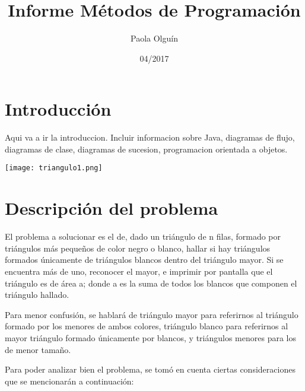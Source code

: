 \documentclass[spanish]{article}
\title{Informe M\'etodos de Programaci\'on}
\date{04/2017}
\author{Paola Olgu\'in}
\begin{document}

  \maketitle{}

  \newpage


  \tableofcontents{}

  \section{Introducci\'on}
  Aqui va a ir la introduccion. Incluir informacion sobre Java, diagramas de flujo,
  diagramas de clase, diagramas de sucesion, programacion orientada a objetos.
  \\
  \begin{center}
  \texttt{[image: triangulo1.png]}
  \end{center}

  \newpage
  \section{Descripci\'on del problema}

  \par
  El problema a solucionar es el de, dado un triángulo de n filas,
  formado por triángulos más pequeños de color negro o blanco, hallar si hay
  triángulos formados únicamente de triángulos blancos dentro del triángulo
  mayor. Si se encuentra más de uno, reconocer el mayor, e imprimir por pantalla
  que el triángulo es de área a; donde a es la suma de todos los blancos que
  componen el triángulo hallado.\par
  Para menor confusión, se hablará de triángulo mayor para
  referirnos al triángulo formado por los menores de ambos colores, triángulo
  blanco para referirnos al mayor triángulo formado únicamente por blancos, y
  triángulos menores para los de menor tamaño.\par
  Para poder analizar bien el problema, se tomó en cuenta ciertas
  consideraciones que se mencionarán a continuación:
\end{document}
